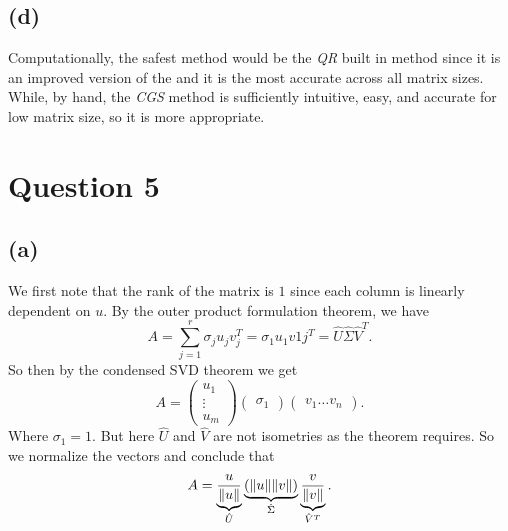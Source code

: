 \documentclass[12pt]{article}
\begin{document}
		\subsection*{(d)}
			Computationally, the safest method would be the \textit{QR} built in method since it is an improved version of the  and it is the most accurate across all matrix sizes. While, by hand, the \textit{CGS} method is sufficiently intuitive, easy, and accurate for low matrix size, so it is more appropriate. 
	\section*{Question 5}
		\subsection*{(a)}
			We first note that the rank of the matrix is $1$ since each column is linearly dependent on $u$. By the outer product formulation theorem, we have 
			$$ A = \sum_{j=1}^{r} \sigma_j u_j v_{j}^{T} = \sigma_1 u_1 v1j^{T} = \hat{U}\hat{\Sigma}\hat{V}^{T}.$$
			So then by the condensed SVD theorem we get 
			$$ A = \begin{pmatrix} u_1 \\ \vdots \\ u_m\end{pmatrix} \begin{pmatrix} \sigma_1 \end{pmatrix} \begin{pmatrix} v_1 \dots v_n\end{pmatrix}.$$
			Where $\sigma_1 =1$. But here $\hat{U}$ and $\hat{V}$ are not isometries as the theorem requires. So we normalize the vectors and conclude that 
			$$ A = \underbrace{\frac{u}{\norm{u}}}_{\hat{U}} \underbrace{(\norm{u}\norm{v})}_{\hat{\Sigma}} \underbrace{\frac{v}{\norm{v}}}_{\hat{V}^{T}}.$$
\end{document}
